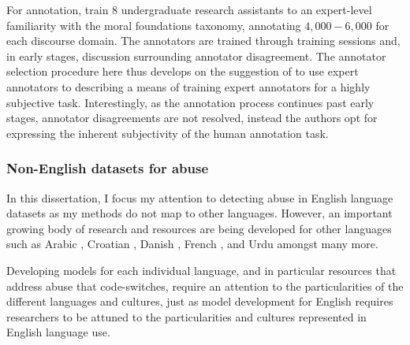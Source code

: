 For annotation, \citet{Hoover:2019} train $8$ undergraduate research assistants to an expert-level familiarity with the moral foundations taxonomy, annotating $4,000 - 6,000$ for each discourse domain. The annotators are trained through training sessions and, in early stages, discussion surrounding annotator disagreement.  
The annotator selection procedure here thus develops on the suggestion of \citet{Waseem:2016} to use expert annotators to describing a means of training expert annotators for a highly subjective task. Interestingly, as the annotation process continues past early stages, annotator disagreements are not resolved, instead the authors opt for expressing the inherent subjectivity of the human annotation task.

\subsubsection{Non-English datasets for abuse}

In this dissertation, I focus my attention to detecting abuse in English language datasets as my methods do not map to other languages. However, an important growing body of research and resources are being developed for other languages such as Arabic \citep{ousidhoum_multilingual_2019,Albadi:2018,mulki_l-hsab_2019}, Croatian \citep{Ljubesic:2018}, Danish \citep{sigurbergsson_offensive_2019}, French \citep{Chiril:2019,Chung:2019}, and Urdu \citep{Rizwan:2020} amongst many more.

Developing models for each individual language, and in particular resources that address abuse that code-switches, require an attention to the particularities of the different languages and cultures, just as model development for English requires researchers to be attuned to the particularities and cultures represented in English language use.


